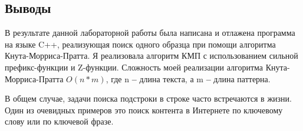 \documentclass[12pt]{article}
\begin{document}
\subsection*{Выводы}

В результате данной лабораторной работы была написана и отлажена программа на языке C++, реализующая поиск одного образца при помощи алгоритма Кнута-Морриса-Пратта. Я реализовала алгоритм КМП с использованием сильной префикс-функции и Z-функции. Сложность моей реализации алгоритма Кнута-Морриса-Пратта ${O}(n*m)$, где n \textbf{--} длина текста, а m \textbf{--} длина паттерна.  

В общем случае, задачи поиска подстроки в строке часто встречаются в жизни. Один из очевидных примеров это поиск контента в Интернете по ключевому слову или по ключевой фразе.
\end{document}
